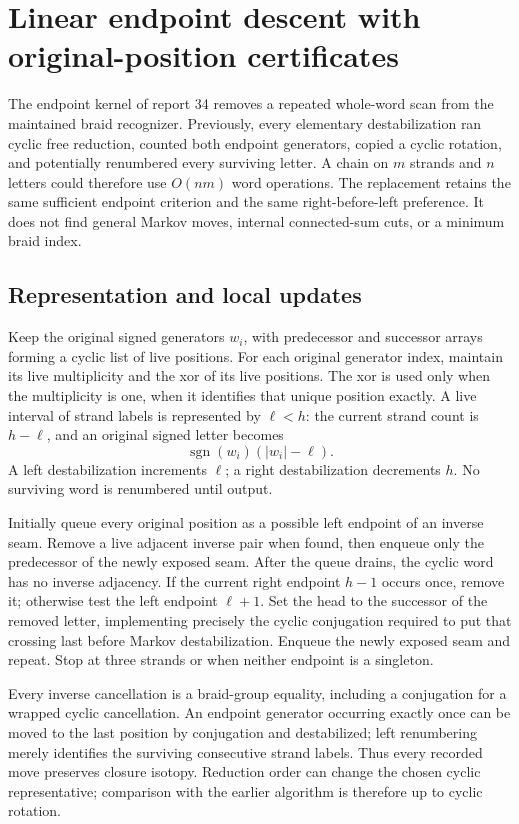 \section{Linear endpoint descent with original-position certificates}
\label{sec:linear-braid-descent}

The endpoint kernel of report 34 removes a repeated whole-word scan from the
maintained braid recognizer. Previously, every elementary destabilization
ran cyclic free reduction, counted both endpoint generators, copied a cyclic
rotation, and potentially renumbered every surviving letter. A chain on
$m$ strands and $n$ letters could therefore use $O(nm)$ word operations.
The replacement retains the same sufficient endpoint criterion and the
same right-before-left preference. It does not find general Markov moves,
internal connected-sum cuts, or a minimum braid index.

\subsection{Representation and local updates}

Keep the original signed generators $w_i$, with predecessor and successor
arrays forming a cyclic list of live positions. For each original generator
index, maintain its live multiplicity and the xor of its live positions.
The xor is used only when the multiplicity is one, when it identifies that
unique position exactly. A live interval of strand labels is represented by
$\ell<h$: the current strand count is $h-\ell$, and an original signed
letter becomes
\[
 \operatorname{sgn}(w_i)(|w_i|-\ell).
\]
A left destabilization increments $\ell$; a right destabilization decrements
$h$. No surviving word is renumbered until output.

Initially queue every original position as a possible left endpoint of an
inverse seam. Remove a live adjacent inverse pair when found, then enqueue
only the predecessor of the newly exposed seam. After the queue drains,
the cyclic word has no inverse adjacency. If the current right endpoint
$h-1$ occurs once, remove it; otherwise test the left endpoint $\ell+1$.
Set the head to the successor of the removed letter, implementing precisely
the cyclic conjugation required to put that crossing last before Markov
destabilization. Enqueue the newly exposed seam and repeat. Stop at three
strands or when neither endpoint is a singleton.

Every inverse cancellation is a braid-group equality, including a conjugation
for a wrapped cyclic cancellation. An endpoint generator occurring exactly
once can be moved to the last position by conjugation and destabilized;
left renumbering merely identifies the surviving consecutive strand labels.
Thus every recorded move preserves closure isotopy. Reduction order can
change the chosen cyclic representative; comparison with the earlier
algorithm is therefore up to cyclic rotation.

